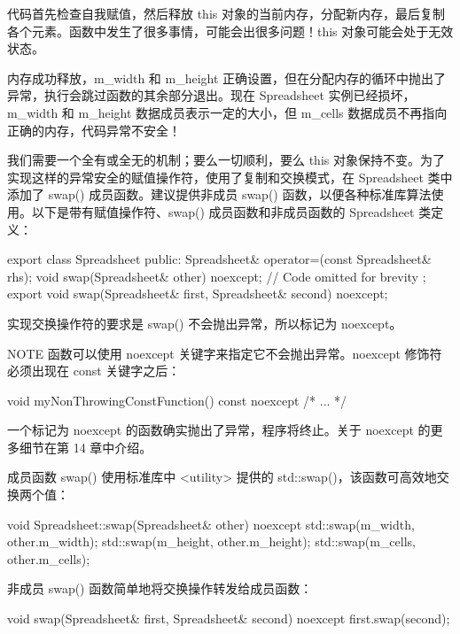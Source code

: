 代码首先检查自我赋值，然后释放 this 对象的当前内存，分配新内存，最后复制各个元素。函数中发生了很多事情，可能会出很多问题！this 对象可能会处于无效状态。

内存成功释放，m\_width 和 m\_height 正确设置，但在分配内存的循环中抛出了异常，执行会跳过函数的其余部分退出。现在 Spreadsheet 实例已经损坏，m\_width 和 m\_height 数据成员表示一定的大小，但 m\_cells 数据成员不再指向正确的内存，代码异常不安全！

我们需要一个全有或全无的机制；要么一切顺利，要么 this 对象保持不变。为了实现这样的异常安全的赋值操作符，使用了复制和交换模式，在 Spreadsheet 类中添加了 swap() 成员函数。建议提供非成员 swap() 函数，以便各种标准库算法使用。以下是带有赋值操作符、swap() 成员函数和非成员函数的 Spreadsheet 类定义：

\begin{cpp}
export class Spreadsheet
{
    public:
        Spreadsheet& operator=(const Spreadsheet& rhs);
        void swap(Spreadsheet& other) noexcept;
        // Code omitted for brevity
};
export void swap(Spreadsheet& first, Spreadsheet& second) noexcept;
\end{cpp}

实现交换操作符的要求是 swap() 不会抛出异常，所以标记为 noexcept。

\begin{myNotic}{NOTE}
函数可以使用 noexcept 关键字来指定它不会抛出异常。noexcept 修饰符必须出现在 const 关键字之后：

\begin{cpp}
void myNonThrowingConstFunction() const noexcept { /* ... */ }
\end{cpp}

一个标记为 noexcept 的函数确实抛出了异常，程序将终止。关于 noexcept 的更多细节在第 14 章中介绍。
\end{myNotic}

成员函数 swap() 使用标准库中 <utility> 提供的 std::swap()，该函数可高效地交换两个值：

\begin{cpp}
void Spreadsheet::swap(Spreadsheet& other) noexcept
{
    std::swap(m_width, other.m_width);
    std::swap(m_height, other.m_height);
    std::swap(m_cells, other.m_cells);
}
\end{cpp}

非成员 swap() 函数简单地将交换操作转发给成员函数：

\begin{cpp}
void swap(Spreadsheet& first, Spreadsheet& second) noexcept
{
    first.swap(second);
}
\end{cpp}

